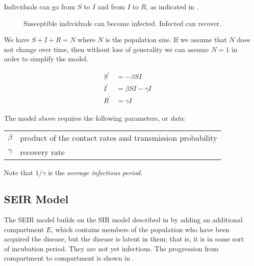 \documentclass[11pt,a4paper,titlepage]{article}
\newcommand*{\dt}[1]{\ensuremath{#1^{\prime}}}%
\theoremstyle{definition}
\begin{document}
Individuals can go from $S$ to $I$ and from $I$ to $R$,
as indicated in .

\begin{figure}
    \caption{
        \label{fig:compartment-flow-sir}
        Susceptible individuals can become infected.
        Infected can recover.
    }
\end{figure}

We have $S + I + R = N$ where $N$ is the population size.
If we assume that $N$ does not change over time,
then without loss of generality we can assume $N=1$ in order to simplify the model.

\begin{align}
    \dt{S} & =  - \beta S I \\%
    \dt{I} & = \beta S I - \gamma I \\%
    \dt{R} & = \gamma I%
\end{align}

The model above requires the following parameters,
or \textit{data}:

\begin{tabular}{cl}
    $\beta$ & product of the contact rates and transmission probability\\%
    $\gamma$ & recovery rate
\end{tabular}

Note that $1/\gamma$ is the \textit{average infectious period}.

\subsection{SEIR Model}
\label{subsec:infectious-disease-models:seir}

The SEIR model builds on the SIR model described in  by adding an additional compartment $E$,
which contains members of the population who have been acquired the disease,
but the disease is latent in them;
that is,
it is in some sort of incubation period.
They are not yet infectious.
The progression from compartment to compartment is shown in .
\end{document}
